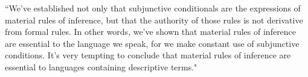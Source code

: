 ``We've established not only that subjunctive conditionals are the expressions of material rules of inference, but that the authority of those rules is not derivative from formal rules. In other words, we've shown that material rules of inference are essential to the language we speak, for we make constant use of subjunctive conditions. It's very tempting to conclude that material rules of inference are essential to languages containing descriptive terms."
